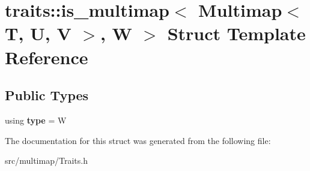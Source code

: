 \hypertarget{structtraits_1_1is__multimap_3_01Multimap_3_01T_00_01U_00_01V_01_4_00_01W_01_4}{}\section{traits\+:\+:is\+\_\+multimap$<$ Multimap$<$ T, U, V $>$, W $>$ Struct Template Reference}
\label{structtraits_1_1is__multimap_3_01Multimap_3_01T_00_01U_00_01V_01_4_00_01W_01_4}
\subsection*{Public Types}
\begin{DoxyCompactItemize}
\item 
\mbox{\label{structtraits_1_1is__multimap_3_01Multimap_3_01T_00_01U_00_01V_01_4_00_01W_01_4_a8b18f2e056648dfbf7296c2b6935db53}} 
using {\bfseries type} = W
\end{DoxyCompactItemize}


The documentation for this struct was generated from the following file\+:\begin{DoxyCompactItemize}
\item 
src/multimap/Traits.\+h\end{DoxyCompactItemize}
